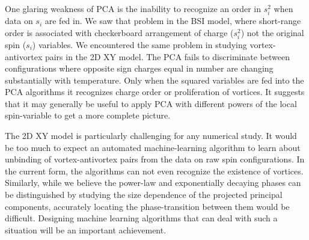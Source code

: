 \documentclass[pra,letterpaper,10pt,twocolumn]{revtex4}
\begin{document}

One glaring weakness of PCA is the inability to recognize an order
in $s_i^2$ when data on $s_i$ are fed in. We saw that problem in 
the BSI model, where short-range order is associated with 
checkerboard arrangement of charge ($s_i^2$)
not the original spin ($s_i$) variables. We encountered the same problem
in studying vortex-antivortex pairs in the 2D XY model. The PCA
fails to discriminate between configurations where opposite sign
charges equal in number are changing substantially with temperature. 
Only when the squared variables are fed into the PCA algorithms it
recognizes charge order or proliferation of vortices. It suggests that
it may generally be useful to apply PCA with different powers of the 
local spin-variable
to get a more complete picture.

The 2D XY model is particularly challenging for any numerical study. It
would be too much to expect an automated machine-learning algorithm to learn 
about unbinding of vortex-antivortex pairs from the data on raw spin 
configurations. In the current form, the algorithms can not even recognize 
the existence of vortices. Similarly, while we believe the power-law and 
exponentially decaying phases can be distinguished by studying the size 
dependence of the projected principal components, accurately locating
the phase-transition between them would be difficult. Designing machine
learning algorithms that can deal with such a situation will be an
important achievement.
\end{document}
